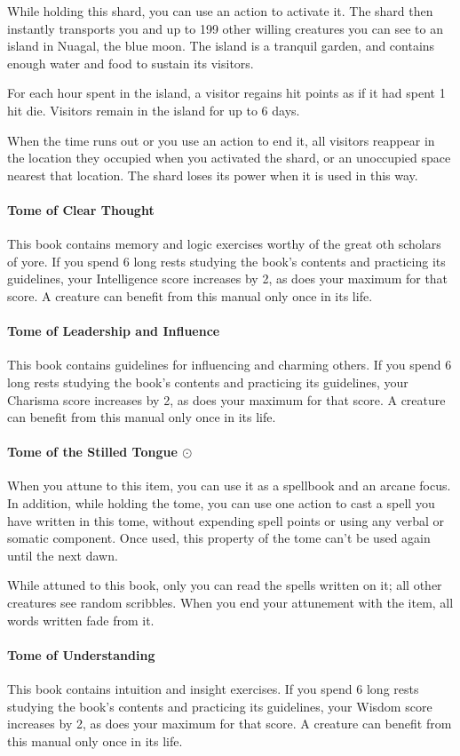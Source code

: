         While holding this shard, you can use an action to activate it.
        The shard then instantly transports you and up to 199 other willing creatures you can see to an island in Nuagal, the blue moon.
        The island is a tranquil garden, and contains enough water and food to sustain its visitors.

        For each hour spent in the island, a visitor regains hit points as if it had spent 1 hit die.
        Visitors remain in the island for up to 6 days.

        When the time runs out or you use an action to end it, all visitors reappear in the location they occupied when you activated the shard, or an unoccupied space nearest that location.
        The shard loses its power when it is used in this way.
    \paragraph{Tome of Clear Thought}
        This book contains memory and logic exercises worthy of the great oth scholars of yore.
        If you spend 6 long rests studying the book's contents and practicing its guidelines, your Intelligence score increases by 2, as does your maximum for that score.
        A creature can benefit from this manual only once in its life.
    \paragraph{Tome of Leadership and Influence}
        This book contains guidelines for influencing and charming others.
        If you spend 6 long rests studying the book's contents and practicing its guidelines, your Charisma score increases by 2, as does your maximum for that score.
        A creature can benefit from this manual only once in its life.
    \paragraph{Tome of the Stilled Tongue $\odot$}
        When you attune to this item, you can use it as a spellbook and an arcane focus.
        In addition, while holding the tome, you can use one action to cast a spell you have written in this tome, without expending spell points or using any verbal or somatic component.
        Once used, this property of the tome can't be used again until the next dawn.

        While attuned to this book, only you can read the spells written on it; all other creatures see random scribbles.
        When you end your attunement with the item, all words written fade from it.
    \paragraph{Tome of Understanding}
        This book contains intuition and insight exercises.
        If you spend 6 long rests studying the book's contents and practicing its guidelines, your Wisdom score increases by 2, as does your maximum for that score.
        A creature can benefit from this manual only once in its life.
